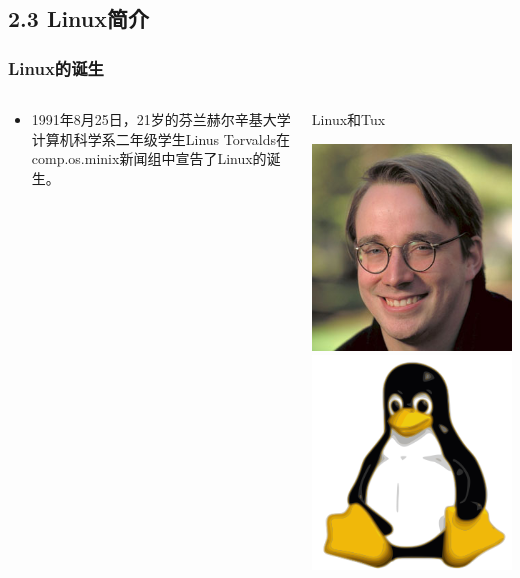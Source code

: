 \documentclass[xcolor=svgnames,bigger,presentation]{beamer}
\begin{document}
\subsection{2.3 Linux简介}
\label{sec-2-3}
\begin{frame}
\frametitle{Linux的诞生}
\label{sec-2-3-1}
\begin{columns}
\begin{column}{0.5\textwidth}
\label{sec-2-3-1-1}
\begin{itemize}

\item 1991年8月25日，21岁的芬兰赫尔辛基大学计算机科学系二年级学生Linus Torvalds在comp.os.minix新闻组中宣告了Linux的诞生。
\label{sec-2-3-1-2}%
\end{itemize} %
\end{column}
\begin{column}{0.5\textwidth}
\begin{exampleblock}{Linux和Tux}
\label{sec-2-3-1-3}

\includegraphics[width=.5\textwidth]{img/linus.jpg}
\includegraphics[width=.5\textwidth]{img/tux.jpg}
\end{exampleblock}
\end{column}
\end{columns}
\end{frame}
\end{document}
